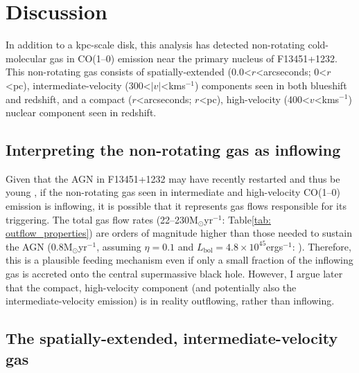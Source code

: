 \section{Discussion}
\label{section: alma_f13451_1232: discussion}

In addition to a kpc-scale disk, this analysis has detected non-rotating cold-molecular gas in CO(1--0) emission near the primary nucleus of F13451+1232. This non-rotating gas consists of spatially-extended (0.0\;\textless\;$r$\;\textless{}\;arcseconds; 0\;\textless\;$r$\;\textless{}\;pc), intermediate-velocity (300\;\textless\;$|v|$\;\textless{}\;km\;s$^{-1}$) components seen in both blueshift and redshift, and a compact ($r$\;\textless{}\;arcseconds; $r$\;\textless{}\;pc), high-velocity (400\;\textless\;$v$\;\textless{}\;km\;s$^{-1}$) nuclear component seen in redshift.

\subsection{Interpreting the non-rotating gas as inflowing}
\label{section: alma_f13451_1232: discussion: inflows}

Given that the AGN in F13451+1232 may have recently restarted and thus be young \citep{Stanghellini2005, Morganti2013_4c1250}, if the non-rotating gas seen in intermediate and high-velocity CO(1--0) emission is inflowing, it is possible that it represents gas flows responsible for its triggering. The total gas flow rates (22--230\;M$_\odot$\;yr$^{-1}$: Table\;\ref{tab: outflow_properties}) are orders of magnitude higher than those needed to sustain the AGN (0.8\;M$_\odot$yr$^{-1}$, assuming $\eta=0.1$ and $L_\mathrm{bol}=4.8\times10^{45}$\;erg\;s$^{-1}$: \citealt{Rose2018}). Therefore, this is a plausible feeding mechanism even if only a small fraction of the inflowing gas is accreted onto the central supermassive black hole. However, I argue later that the compact, high-velocity component (and potentially also the intermediate-velocity emission) is in reality outflowing, rather than inflowing.

\subsection{The spatially-extended, intermediate-velocity gas}
\label{section: alma_f13451_1232: discussion: intermediate_velocity_gas}

